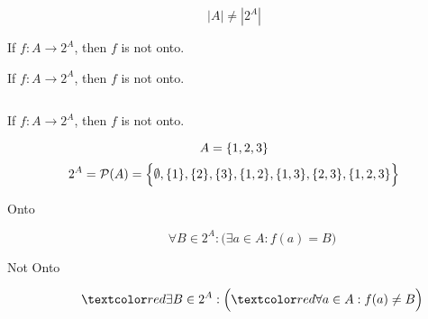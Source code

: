 
\begin{frame}{}
  \begin{theorem}
    \[
      |A| \neq |2^{A}|
    \]
  \end{theorem}

  \pause
  \begin{theorem}
    If $f: A \to 2^{A}$, then $f$ is not onto.
  \end{theorem}

  \pause
  \vspace{0.60cm}
\end{frame}

\begin{frame}{}
  \begin{theorem}
    If $f: A \to 2^{A}$, then $f$ is not onto.
  \end{theorem}

  \vspace{0.60cm}
  \begin{columns}
    \pause
    \pause
    \pause
  \end{columns}
\end{frame}

\begin{frame}{}
  \begin{theorem}
    If $f: A \to 2^{A}$, then $f$ is not onto.
  \end{theorem}

  \vspace{0.30cm}
  \[
    A = \{1,2,3\}
  \]
  \pause
  \[
    2^{A} = \mathcal{P}(A) = \Big\{\emptyset, \{1\}, \{2\}, \{3\}, \{1,2\}, \{1,3\}, \{2,3\}, \{1,2,3\}\Big\}
  \]

  \pause
  \begin{description}
    \item[Onto]
      \[
	\forall B \in 2^{A}: \Big(\exists a \in A: f(a) = B\Big)
      \]
    \pause
    \item[Not Onto]
      \[
	\red{\exists} B \in 2^{A}: \Big(\red{\forall} a \in A: f(a) \neq B\Big)
      \]
  \end{description}
\end{frame}

